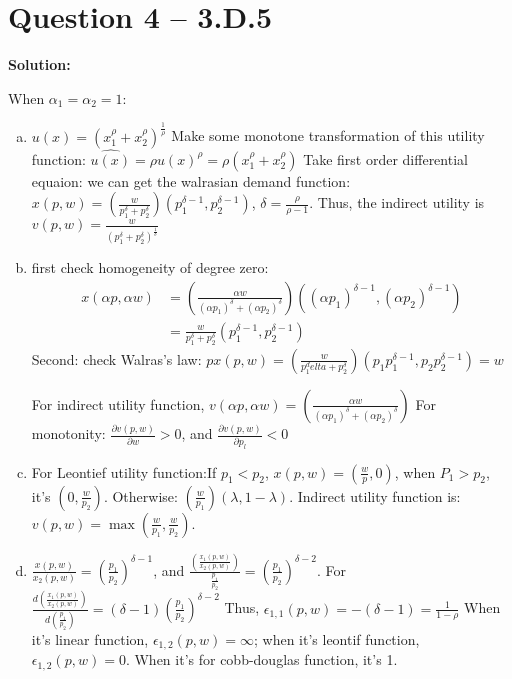 \documentclass[11pt]{article} %
\begin{document}
\section{Question 4 -- 3.D.5}
\textbf{Solution:}

	When $\alpha_1=\alpha_2=1$:
\begin{enumerate}[(a)]
	\item $u(x)=(x_1^\rho+x_2^\rho)^{\frac{1}{\rho}}$ Make some monotone transformation of this utility function: $\hat{u(x)}=\rho u(x)^\rho=\rho(x_1^\rho+x_2^\rho)$
		 Take first order differential equaion: we can get the walrasian demand function: $x(p,w)=(\frac{w}{p_1^\delta+p_2^\delta})(p_1^{\delta-1},p_2^{\delta-1})$, $\delta=\frac{\rho}{\rho-1}$.
		 Thus, the indirect utility is $v(p,w)=\frac{w}{(p_1^\delta+p_2^\delta)^{\frac{1}{\delta}}}$ 
	\item first check homogeneity of degree zero:
		\begin{align*}
			x(\alpha p, \alpha w)&=(\frac{\alpha w}{(\alpha p_1)^\delta+(\alpha p_2)^\delta})((\alpha p_1)^{\delta-1},(\alpha p_2)^{\delta-1})\\
								&=\frac{w}{p_1^\delta+p_2^\delta}(p_1^{\delta-1},p_2^{\delta-1})
		\end{align*}
		Second: check Walras's law:
		$px(p,w)=(\frac{w}{p_1^delta+p_2^\delta})(p_1 p_1^{\delta-1},p_2p_2^{\delta-1})=w$

		For indirect utility function, $v(\alpha p, \alpha w)=(\frac{\alpha w}{(\alpha p_1)^\delta+(\alpha p_2)^\delta}) $
		For monotonity: $\frac{\partial v(p,w)}{\partial w}>0$, and $\frac{\partial v(p,w)}{\partial p_l}<0$
	\item For Leontief utility function:If $p_1<p_2$, $x(p,w)=(\frac{w}{p},0)$, when $P_1>p_2$, it's $(0,\frac{w}{p_2})$. Otherwise: $(\frac{w}{p_1})(\lambda,1-\lambda)$. Indirect utility function is: $v(p,w)=\max(\frac{w}{p_1},\frac{w}{p_2})$.
	\item $\frac{x(p,w)}{x_2(p,w)}=(\frac{p_1}{p_2})^{\delta-1}$, and $\frac{(\frac{x_1(p,w)}{x_2(p,w)})}{\frac{p_1}{p_2}}=(\frac{p_1}{p_2})^{\delta-2}$. For $\frac{d(\frac{x_1(p,w)}{x_2(p,w)})}{d(\frac{p_1}{p_2})}=(\delta-1)(\frac{p_1}{p_2})^{\delta-2}$ Thus, $\epsilon_{1,1}(p,w)=-(\delta-1)=\frac{1}{1-\rho}$ 
			When it's linear function, $\epsilon_{1,2}(p,w)=\infty$; when it's leontif function, $\epsilon_{1,2}(p,w)=0$. When it's for cobb-douglas function, it's 1.
\end{enumerate}
\end{document}
